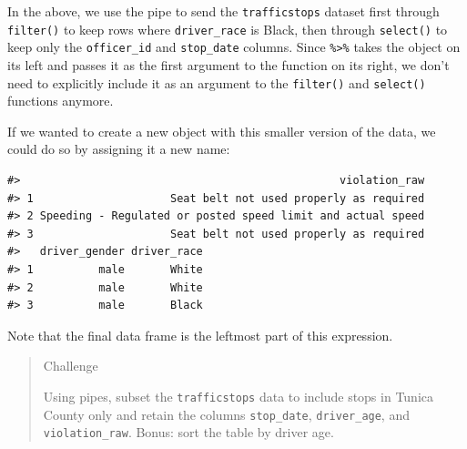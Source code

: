 \documentclass[]{book}
\newenvironment{Shaded}{\begin{snugshade}}{\end{snugshade}}
\newcommand{\KeywordTok}[1]{\textcolor[rgb]{0.13,0.29,0.53}{\textbf{#1}}}
\newcommand{\DecValTok}[1]{\textcolor[rgb]{0.00,0.00,0.81}{#1}}
\newcommand{\StringTok}[1]{\textcolor[rgb]{0.31,0.60,0.02}{#1}}
\newcommand{\OperatorTok}[1]{\textcolor[rgb]{0.81,0.36,0.00}{\textbf{#1}}}
\newcommand{\NormalTok}[1]{#1}
\theoremstyle{definition}
\theoremstyle{definition}
\theoremstyle{definition}
\theoremstyle{remark}
\begin{document}
\begin{Shaded}
\end{Shaded}

In the above, we use the pipe to send the \texttt{trafficstops} dataset
first through \texttt{filter()} to keep rows where \texttt{driver\_race}
is Black, then through \texttt{select()} to keep only the
\texttt{officer\_id} and \texttt{stop\_date} columns. Since
\texttt{\%\textgreater{}\%} takes the object on its left and passes it
as the first argument to the function on its right, we don't need to
explicitly include it as an argument to the \texttt{filter()} and
\texttt{select()} functions anymore.

If we wanted to create a new object with this smaller version of the
data, we could do so by assigning it a new name:

\begin{Shaded}
\end{Shaded}

\begin{verbatim}
#>                                                 violation_raw
#> 1                     Seat belt not used properly as required
#> 2 Speeding - Regulated or posted speed limit and actual speed
#> 3                     Seat belt not used properly as required
#>   driver_gender driver_race
#> 1          male       White
#> 2          male       White
#> 3          male       Black
\end{verbatim}

Note that the final data frame is the leftmost part of this expression.

\begin{quote}
Challenge

Using pipes, subset the \texttt{trafficstops} data to include stops in
Tunica County only and retain the columns \texttt{stop\_date},
\texttt{driver\_age}, and \texttt{violation\_raw}. Bonus: sort the table
by driver age.
\end{quote}
\end{document}
